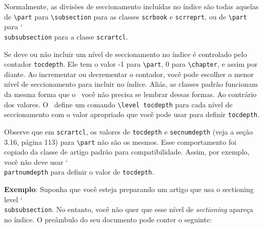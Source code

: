 Normalmente, as divisões de seccionamento incluídas no índice são todas aquelas de \verb|\part| para \verb|\subsection| para as classes \texttt{scrbook} e \texttt{scrreprt}, ou de \verb|\part| para \char`\\\texttt{sub\-sub\-sec\-tion} para a classe \texttt{scrartcl}.

Se deve ou não incluir um nível de seccionamento no índice é controlado pelo contador \texttt{tocdepth}. Ele tem o valor -1 para \verb|\part|, 0 para \verb|\chapter|, e assim por diante. Ao incrementar ou decrementar o contador, você pode escolher o menor nível  de seccionamento para incluir no índice. Aliás, as classes padrão funcionam da mesma forma que o \KOMAScript\, você não precisa se lembrar dessas formas. Ao contrário dos valores. O \KOMAScript\ define um comando \verb|\level tocdepth| para cada nível de seccionamento com o valor apropriado que você pode usar para definir \verb|tocdepth|.

Observe que em \texttt{scrartcl}, os valores de \verb|tocdepth| e \verb|secnumdepth| (veja a seção 3.16, página 113) para \verb|\part| não são os mesmos. Esse comportamento foi copiado da classe de artigo padrão para compatibilidade. Assim, por exemplo, você não deve usar \char`\\\texttt{part\-num\-depth} para definir o valor de \verb|tocdepth|.

\textbf{Exemplo}: Suponha que você esteja preparando um artigo que usa o sectioning level \char`\\\texttt{sub\-sub\-section}. No entanto, você não quer que esse nível de \textit{sectioning} apareça no índice. O preâmbulo do seu documento pode conter o seguinte:

